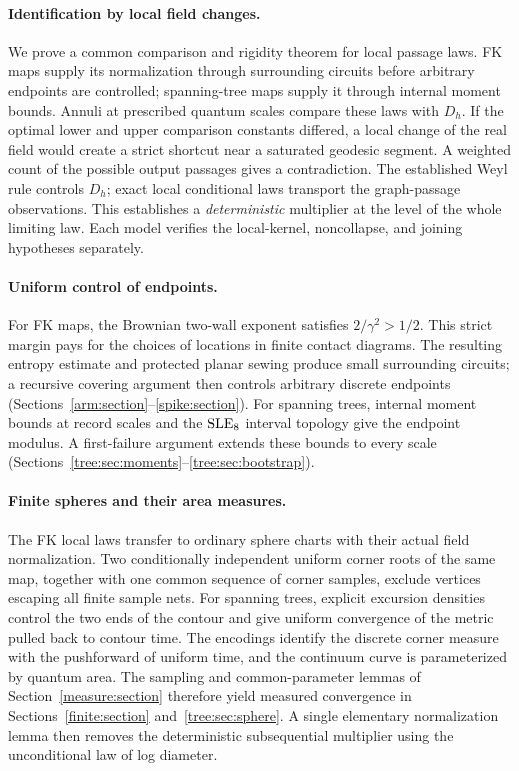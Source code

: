 \paragraph{Identification by local field changes.}
We prove a common comparison and rigidity theorem for local passage
laws. FK maps supply its normalization through surrounding circuits
before arbitrary endpoints are controlled; spanning-tree maps supply
it through internal moment bounds. Annuli at prescribed quantum scales
compare these laws with \(D_h\). If the optimal lower
and upper comparison constants differed, a local change of the real
field would create a strict shortcut near a saturated geodesic segment.
A weighted count of the possible output passages gives a contradiction.
The established Weyl rule controls \(D_h\); exact local conditional laws
transport the graph-passage observations. This establishes a
\emph{deterministic} multiplier at the level of the whole limiting law.
Each model verifies the local-kernel, noncollapse, and joining
hypotheses separately.

\paragraph{Uniform control of endpoints.}
For FK maps, the Brownian two-wall exponent satisfies
\(2/\gamma^2>1/2\). This strict margin pays for the choices of locations
in finite contact diagrams. The resulting entropy estimate and
protected planar sewing produce small surrounding circuits; a recursive
covering argument then controls arbitrary discrete endpoints
(Sections~\ref{arm:section}--\ref{spike:section}).
For spanning trees, internal moment bounds at record scales and the
\(\mathrm{SLE}_8\) interval topology give the endpoint modulus. A first-failure
argument extends these bounds to every scale
(Sections~\ref{tree:sec:moments}--\ref{tree:sec:bootstrap}).

\paragraph{Finite spheres and their area measures.}
The FK local laws transfer to ordinary sphere charts with their actual
field normalization. Two conditionally independent uniform corner roots
of the same map, together with one common sequence of corner samples,
exclude vertices escaping all finite sample nets.
For spanning trees, explicit excursion densities control the two ends
of the contour and give uniform convergence of the metric pulled back
to contour time. The encodings identify the discrete corner measure
with the pushforward of uniform time, and the continuum curve is
parameterized by quantum area. The sampling and common-parameter lemmas
of Section~\ref{measure:section} therefore yield measured convergence
in Sections~\ref{finite:section} and~\ref{tree:sec:sphere}.
A single elementary normalization lemma then removes the deterministic
subsequential multiplier using the unconditional law of log diameter.

